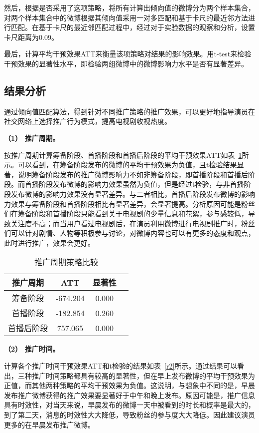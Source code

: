 然后，根据是否采用了这项策略，将所有计算出倾向值的微博分为两个样本集合，对两个样本集合中的微博根据其倾向值采用一对多匹配和基于卡尺的最近邻方法进行匹配。在基于卡尺的最近邻匹配过程中，经过对于实验数据的观察和分析，设置卡尺距离为0.09。

最后，计算平均干预效果ATT来衡量该项策略对结果的影响效果。用t-test来检验干预效果的显著性水平，即检验两组微博中的微博影响力水平是否有显著差异。

\subsection{结果分析}

通过倾向值匹配算法，得到针对不同推广策略的推广效果，可以更好地指导演员在社交网络上选择推广行为模式，提高电视剧收视热度。

\textbf{（1） 推广周期。}

按推广周期计算筹备阶段、首播阶段和首播后阶段的平均干预效果ATT如表~\ref{r1}所示。可以看到，在筹备阶段发布的微博的平均干预效果为负值，且t检验结果显著，说明筹备阶段发布的推广微博影响力不如非筹备阶段，即首播阶段和首播后阶段。而首播阶段发布微博的影响力效果虽然为负值，但是经过t检验，与非首播阶段发布微博的影响力效果没有显著差异。与二者相比，首播后阶段发布微博的影响力效果与筹备阶段和首播阶段相比有显著差异，会显著提高。分析原因可能是粉丝们在筹备阶段和首播阶段只能看到关于电视剧的少量信息和花絮，参与感较低，导致关注度不高；而当用户看过电视剧后，在演员利用微博进行电视剧推广时，粉丝们可以针对剧情、人物等积极参与讨论，对微博内容也可以有更多的态度和观点，此时进行推广，效果会更好。

\begin{table}[h]
\centering
\caption{推广周期策略比较}
\label{r1}
\begin{tabular}{|c|c|c|c|} \hline
推广周期 & ATT & 显著性\\ \hline
筹备阶段 & -674.204& 0.000\\ \hline
首播阶段 & -182.854& 0.260\\ \hline
首播后阶段 & 757.065 & 0.000\\ 
\hline\end{tabular}

\end{table}

\textbf{（2） 推广时间。}

计算各个推广时间干预效果ATT和t检验的结果如表~\ref{r2}所示。通过结果可以看出，三种推广时间策略都具有较高的显著性，但在早上发布微博的平均干预效果为正值，而其他两种策略的平均干预效果为负值。这说明，与想象中不同的是，早晨发布推广微博获得的推广效果要显著好于中午和晚上发布。原因可能是，推广信息具有时效性，对当天来说，早晨发布的微博一天中被看到的时长和概率是最大的，到了第二天，消息的时效性大大降低，导致粉丝的参与度大大降低。因此建议演员更多的在早晨发布推广微博。

